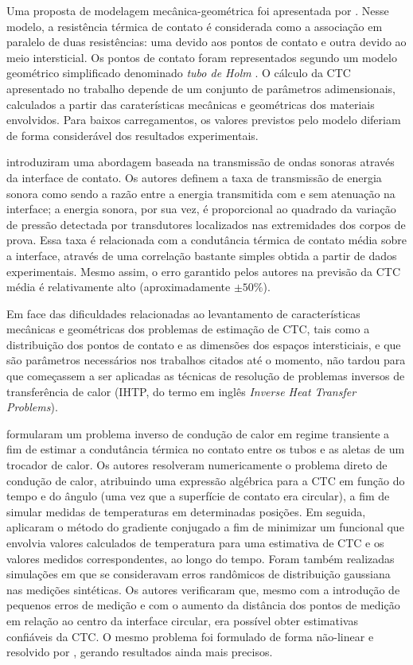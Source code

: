 Uma proposta de modelagem mecânica-geométrica foi apresentada por \cite{artigo_salgon}. Nesse modelo, a resistência térmica de contato é considerada
como a associação em paralelo de duas resistências: uma devido aos pontos de contato e outra devido ao meio intersticial. Os pontos de contato foram
representados segundo um modelo geométrico simplificado denominado \textit{tubo de Holm} \citep{livro_holm}. O cálculo da CTC apresentado no trabalho
depende de um conjunto de parâmetros adimensionais, calculados a partir das caraterísticas mecânicas e geométricas dos materiais envolvidos. Para baixos carregamentos,
os valores previstos pelo modelo diferiam de forma considerável dos resultados experimentais.

\cite{artigo_tomimura} introduziram uma abordagem baseada na transmissão de ondas sonoras através da interface de contato. Os autores definem a
taxa de transmissão de energia sonora como sendo a razão entre a energia transmitida com e sem atenuação na interface; a energia sonora, por sua
vez, é proporcional ao quadrado da variação de pressão detectada por transdutores localizados nas extremidades dos corpos de prova.
Essa taxa é relacionada com a condutância térmica de contato média sobre a interface, através de uma correlação bastante simples obtida a partir de dados
experimentais. Mesmo assim, o erro garantido pelos autores na previsão da CTC média é relativamente alto (aproximadamente $\pm 50 \%$).

Em face das dificuldades relacionadas ao levantamento de características mecânicas e geométricas dos problemas de estimação de CTC, 
tais como a distribuição dos pontos de contato e as dimensões dos espaços intersticiais, e que são parâmetros necessários nos trabalhos citados
até o momento, não tardou para que começassem a ser aplicadas as técnicas de resolução de problemas inversos de transferência de calor (IHTP, do termo em inglês \textit{Inverse Heat Transfer Problems}).

\cite{artigo_huang} formularam um problema inverso de condução de calor em regime transiente a fim de estimar a condutância térmica no contato entre
os tubos e as aletas de um trocador de calor. Os autores resolveram numericamente o problema direto de condução de calor, atribuindo uma expressão
algébrica para a CTC em função do tempo e do ângulo (uma vez que a superfície de contato era circular), a fim de simular medidas de temperaturas
em determinadas posições. Em seguida, aplicaram o método do gradiente conjugado a fim de minimizar um funcional que envolvia valores calculados
de temperatura para uma estimativa de CTC e os valores medidos correspondentes, ao longo do tempo. Foram também realizadas simulações em que se
consideravam erros randômicos de distribuição gaussiana nas medições sintéticas. Os autores verificaram que, mesmo com a introdução de pequenos erros de medição e com
o aumento da distância dos pontos de medição em relação ao centro da interface circular, era possível obter estimativas confiáveis da CTC. O mesmo
problema foi formulado de forma não-linear e resolvido por \cite{artigo_huang_2}, gerando resultados ainda mais precisos.

